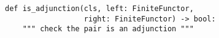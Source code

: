 \begin{verbatim}
def is_adjunction(cls, left: FiniteFunctor,
                  right: FiniteFunctor) -> bool:
    """ check the pair is an adjunction """
\end{verbatim}